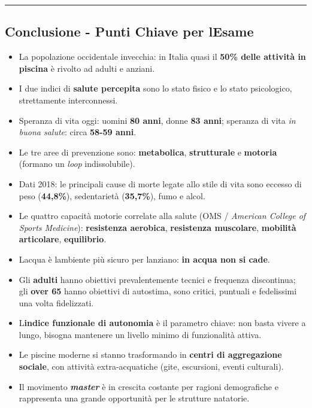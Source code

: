 \documentclass[a4paper,11pt]{article}
\providecommand{\tightlist}{%
  \setlength{\itemsep}{0pt}\setlength{\parskip}{0pt}}
\begin{document}
\begin{center}\rule{0.5\linewidth}{0.5pt}\end{center}

\subsection{Conclusione - Punti Chiave per
      l\textquotesingle Esame}\label{conclusione---punti-chiave-per-lesame-9}

\begin{itemize}
      \tightlist
      \item
            La popolazione occidentale invecchia: in Italia quasi il \textbf{50\%
                  delle attività in piscina} è rivolto ad adulti e anziani.
      \item
            I due indici di \textbf{salute percepita} sono lo stato fisico e lo
            stato psicologico, strettamente interconnessi.
      \item
            Speranza di vita oggi: uomini \textbf{80 anni}, donne \textbf{83
                  anni}; speranza di vita \emph{in buona salute}: circa \textbf{58-59
                  anni}.
      \item
            Le tre aree di prevenzione sono: \textbf{metabolica},
            \textbf{strutturale} e \textbf{motoria} (formano un \emph{loop}
            indissolubile).
      \item
            Dati 2018: le principali cause di morte legate allo stile di vita sono
            eccesso di peso (\textbf{44,8\%}), sedentarietà (\textbf{35,7\%}),
            fumo e alcol.
      \item
            Le quattro capacità motorie correlate alla salute (OMS /
            \emph{American College of Sports Medicine}): \textbf{resistenza
                  aerobica}, \textbf{resistenza muscolare}, \textbf{mobilità
                  articolare}, \textbf{equilibrio}.
      \item
            L\textquotesingle acqua è l\textquotesingle ambiente più sicuro per
            l\textquotesingle anziano: \textbf{in acqua non si cade}.
      \item
            Gli \textbf{adulti} hanno obiettivi prevalentemente tecnici e
            frequenza discontinua; gli \textbf{over 65} hanno obiettivi di
            autostima, sono critici, puntuali e fedelissimi una volta fidelizzati.
      \item
            L\textquotesingle{}\textbf{indice funzionale di autonomia} è il
            parametro chiave: non basta vivere a lungo, bisogna mantenere un
            livello minimo di funzionalità attiva.
      \item
            Le piscine moderne si stanno trasformando in \textbf{centri di
                  aggregazione sociale}, con attività extra-acquatiche (gite,
            escursioni, eventi culturali).
      \item
            Il movimento \textbf{\emph{master}} è in crescita costante per ragioni
            demografiche e rappresenta una grande opportunità per le strutture
            natatorie.
\end{itemize}
\end{document}
